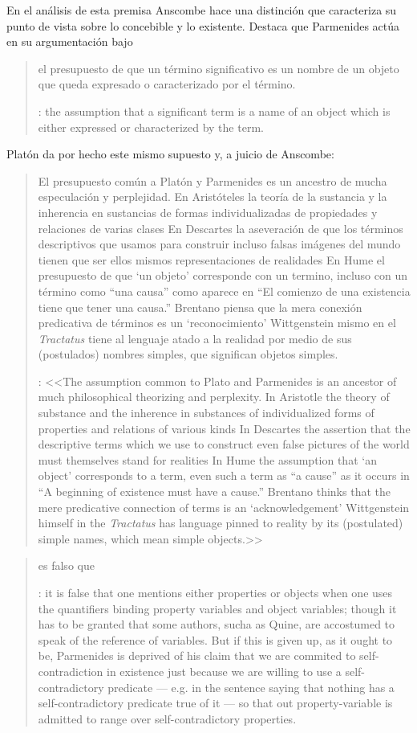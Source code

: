En el análisis de esta premisa Anscombe hace una distinción que caracteriza su punto de vista sobre lo concebible y lo existente. Destaca que Parmenides actúa en su argumentación bajo \blockquote[{\cite[x]{anscombe1981parmenides}}: \textelp{} the assumption that a significant term is a name of an object which is either expressed or characterized by the term.]{\textelp{} el presupuesto de que un término significativo es un nombre de un objeto que queda expresado o caracterizado por el término.}  Platón da por hecho este mismo supuesto y, a juicio de Anscombe: \blockquote[{\cite[xi]{anscombe1981parmenides}}: <<The assumption common to Plato and Parmenides is an ancestor of much philosophical theorizing and perplexity. In Aristotle \textelp{} the theory of substance and the inherence in substances of individualized forms of properties and relations of various kinds \textelp{} In Descartes \textelp{} the assertion that the descriptive terms which we use to construct even false pictures of the world must themselves stand for realities \textelp{} In Hume \textelp{} the assumption that `an object' corresponds to a term, even such a term as ``a cause'' as it occurs in ``A beginning of existence must have a cause.'' \textelp{} Brentano thinks that the mere predicative connection of terms is an `acknowledgement' \textelp{} Wittgenstein himself in the \emph{Tractatus} has language pinned to reality by its (postulated) simple names, which mean simple objects.>>]{El presupuesto común a Platón y Parmenides es un ancestro de mucha especulación y perplejidad. En Aristóteles \textelp{} la teoría de la sustancia y la inherencia en sustancias de formas individualizadas de propiedades y relaciones de varias clases \textelp{} En Descartes \textelp{} la aseveración de que los términos descriptivos que usamos para construir incluso falsas imágenes del mundo tienen que ser ellos mismos representaciones de realidades \textelp{} En Hume \textelp{} el presupuesto de que `un objeto' corresponde con un termino, incluso con un término como ``una causa'' como aparece en ``El comienzo de una existencia tiene que tener una causa.'' \textelp{} Brentano piensa que la mera conexión predicativa de términos es un `reconocimiento' \textelp{} Wittgenstein mismo en el \emph{Tractatus} tiene al lenguaje atado a la realidad por medio de sus (postulados) nombres simples, que significan objetos simples.}



\blockquote[{\cite[5]{anscombe1981parmenides:pmc}}: it is false that one mentions either properties or objects when one uses the quantifiers binding property variables and object variables; though it has to be granted that some authors, sucha as Quine, are accostumed to speak of the reference of variables. But if this is given up, as it ought to be, Parmenides is deprived of his claim that we are commited to self-contradiction in existence just because we are willing to use a self-contradictory predicate --- e.g. in the sentence saying that nothing has a self-contradictory predicate true of it --- so that out property-variable is admitted to range over self-contradictory properties.]{es falso que }

